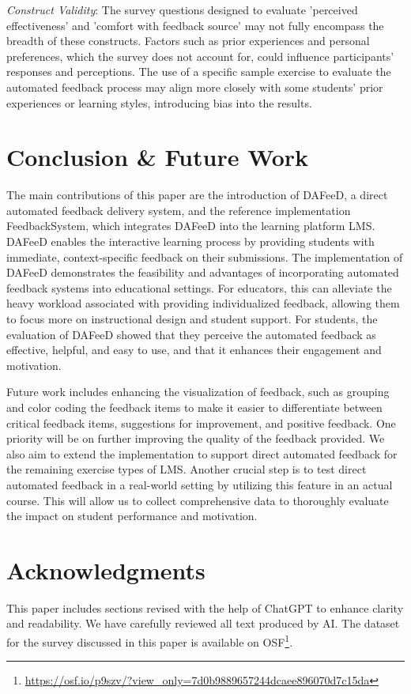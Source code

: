 \documentclass[manuscript,screen,review, anonymous]{acmart}
\begin{document}
\textit{Construct Validity}: 
The survey questions designed to evaluate 'perceived effectiveness' and 'comfort with feedback source' may not fully encompass the breadth of these constructs.
Factors such as prior experiences and personal preferences, which the survey does not account for, could influence participants' responses and perceptions.
The use of a specific sample exercise to evaluate the automated feedback process may align more closely with some students' prior experiences or learning styles, introducing bias into the results.


\section{Conclusion \& Future Work} %
\label{sec:conclusion}

The main contributions of this paper are the introduction of DAFeeD, a direct automated feedback delivery system, and the reference implementation FeedbackSystem, which integrates DAFeeD into the learning platform LMS.
DAFeeD enables the interactive learning process by providing students with immediate, context-specific feedback on their submissions.
The implementation of DAFeeD demonstrates the feasibility and advantages of incorporating automated feedback systems into educational settings. 
For educators, this can alleviate the heavy workload associated with providing individualized feedback, allowing them to focus more on instructional design and student support.
For students, the evaluation of DAFeeD showed that they perceive the automated feedback as effective, helpful, and easy to use, and that it enhances their engagement and motivation.

% 
Future work includes enhancing the visualization of feedback, such as grouping and color coding the feedback items to make it easier to differentiate between critical feedback items, suggestions for improvement, and positive feedback.
One priority will be on further improving the quality of the feedback provided.
We also aim to extend the implementation to support direct automated feedback for the remaining exercise types of LMS.
Another crucial step is to test direct automated feedback in a real-world setting by utilizing this feature in an actual course. 
This will allow us to collect comprehensive data to thoroughly evaluate the impact on student performance and motivation.


\appendix

\section{Acknowledgments}
This paper includes sections revised with the help of ChatGPT to enhance clarity and readability.
We have carefully reviewed all text produced by AI.
The dataset for the survey discussed in this paper is available on OSF\footnote{\url{https://osf.io/p9szv/?view_only=7d0b9889657244dcaee896070d7c15da}}.



\end{document}
